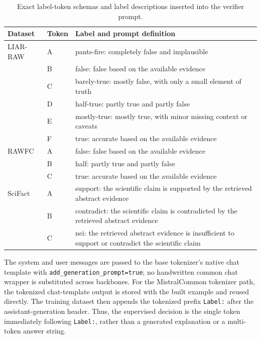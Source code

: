 \begin{table}[t]
\centering
\small
\setlength{\tabcolsep}{4pt}
\renewcommand{\arraystretch}{1.08}
\caption{Exact label-token schemas and label descriptions inserted into the verifier prompt.}
\label{tab:supp-label-schemas}
\begin{tabular}{p{}p{}p{}}
\hline
\textbf{Dataset} & \textbf{Token} & \textbf{Label and prompt definition}\\
\hline
LIAR-RAW & A & pants-fire: completely false and implausible\\
         & B & false: false based on the available evidence\\
         & C & barely-true: mostly false, with only a small element of truth\\
         & D & half-true: partly true and partly false\\
         & E & mostly-true: mostly true, with minor missing context or caveats\\
         & F & true: accurate based on the available evidence\\
\hline
RAWFC & A & false: false based on the available evidence\\
      & B & half: partly true and partly false\\
      & C & true: accurate based on the available evidence\\
\hline
SciFact & A & support: the scientific claim is supported by the retrieved abstract evidence\\
        & B & contradict: the scientific claim is contradicted by the retrieved abstract evidence\\
        & C & nei: the retrieved abstract evidence is insufficient to support or contradict the scientific claim\\
\hline
\end{tabular}
\end{table}

The system and user messages are passed to the base tokenizer's native
chat template with \texttt{add\_generation\_prompt=true}; no handwritten
common chat wrapper is substituted across backbones.  For the
MistralCommon tokenizer path, the tokenized chat-template output is stored
with the built example and reused directly.  The training dataset then
appends the tokenized prefix \texttt{Label:} after the assistant-generation
header.  Thus, the supervised decision is the single token immediately
following \texttt{Label:}, rather than a generated explanation or a
multi-token answer string.


